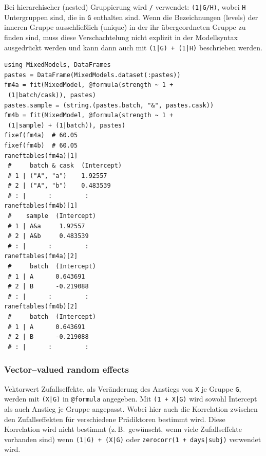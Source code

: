 \documentclass[10pt,twocolumn]{scrartcl}
\begin{document}
Bei hierarchischer (nested) Gruppierung wird \lstinline|/| verwendet:
\lstinline"(1|G/H)", wobei \lstinline|H| Untergruppen sind, die in \lstinline|G|
enthalten sind. Wenn die Bezeichnungen (levels) der inneren Gruppe
ausschließlich (unique) in der ihr übergeordneten Gruppe zu finden sind, muss
diese Verschachtelung nicht explizit in der Modellsyntax ausgedrückt werden und
kann dann auch mit \lstinline"(1|G) + (1|H)" beschrieben werden.

\begin{lstlisting}
using MixedModels, DataFrames
pastes = DataFrame(MixedModels.dataset(:pastes))
fm4a = fit(MixedModel, @formula(strength ~ 1 +
 (1|batch/cask)), pastes)
pastes.sample = (string.(pastes.batch, "&", pastes.cask))
fm4b = fit(MixedModel, @formula(strength ~ 1 +
 (1|sample) + (1|batch)), pastes)
fixef(fm4a)  # 60.05
fixef(fm4b)  # 60.05
raneftables(fm4a)[1]
 #     batch & cask  (Intercept)
 # 1 | ("A", "a")    1.92557
 # 2 | ("A", "b")    0.483539
 # : |      :         :
raneftables(fm4b)[1]
 #    sample  (Intercept)
 # 1 | A&a     1.92557
 # 2 | A&b     0.483539
 # : |      :         :
raneftables(fm4a)[2]
 #     batch  (Intercept)
 # 1 | A      0.643691
 # 2 | B      -0.219088
 # : |      :         :
raneftables(fm4b)[2]
 #     batch  (Intercept)
 # 1 | A      0.643691
 # 2 | B      -0.219088
 # : |      :         :
\end{lstlisting}

\subsubsection{Vector--valued random effects}

Vektorwert Zufallseffekte, als Veränderung des Anstiegs von \lstinline|X| je
Gruppe \lstinline|G|, werden mit \lstinline"(X|G)" in \lstinline|@formula|
angegeben. Mit \lstinline"(1 + X|G)" wird sowohl Intercept als auch Anstieg je
Gruppe angepasst. Wobei hier auch die Korrelation zwischen den Zufallseffekten
für verschiedene Prädiktoren bestimmt wird. Diese Korrelation wird nicht
bestimmt (z.\,B.\ gewünscht, wenn viele Zufallseffekte vorhanden sind) wenn
\lstinline"(1|G) + (X|G)" oder \lstinline"zerocorr(1 + days|subj)" verwendet
wird.
\end{document}
